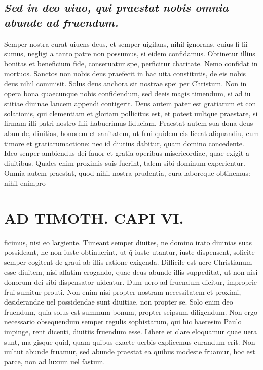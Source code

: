 \documentclass{article}
\begin{document}
\begin{pages}
\subsection*{\textit{Sed in deo uiuo, qui praestat nobis omnia abunde ad fruendum. }}\pstart Semper nostra curat uiuens deus, et semper uigilans, nihil ignorans, cuius fi lii sumus, negligi a tanto patre non possumus, si eidem confidamus. Obtinetur illius bonitas et beneficium fide, conseruatur spe, perficitur charitate. Nemo confidat in mortuos. Sanctos non nobis deus praefecit in hac uita constitutis, de eis nobis deus nihil commisit. Solus deus anchora sit nostrae spei per Christum. Non in opera bona quaecunque nobis confidendum, sed deeis magis timendum, si ad iu stitiae diuinae lancem appendi contigerit. Deus autem pater est gratiarum et con solationis, qui clementiam et gloriam pollicitus est, et potest uultque praestare, si firmam illi patri nostro filii habuerimus fiduciam. Praestat autem sua dona deus abun de, diuitias, honorem et sanitatem, ut frui quidem eis liceat aliquandiu, cum timore et gratiarumactione: nec id diutius dabitur, quam domino concedente. Ideo senper ambiendus dei fauor et gratia operibus misericordiae, quae exigit a diuitibus. Quales enim proximis suis fuerint, talem sibi dominum experientur. Omnia autem praestat, quod nihil nostra prudentia, cura laboreque obtinemus: nihil enimpro  \pend
{}
{}
\subsection*{\textit{}}
\section*{AD TIMOTH. CAPI VI. }
\marginpar{[ p.541 ]}\pstart ficimus, nisi eo largiente. Timeant semper diuites, ne domino irato diuinias suas possideant, ne non iuste obtinuerint, ut q̃ iuste utantur, iuste dispensent, solicite semper cogitent de graui ab illis ratione exigenda. Difficile est uere Christianum esse diuitem, nisi affatim erogando, quae deus abunde illis suppeditat, ut non nisi donorum dei sibi dispensator uideatur. Dum uero ad fruendum dicitur, improprie frui sumitur prouti. Non enim nisi propter nostram necessitatem et proximi, desiderandae uel possidendae sunt diuitiae, non propter se. Solo enim deo fruendum, quia solus est summum bonum, propter seipsum diligendum. Non ergo necessario obsequendum semper regulis sophistarum, qui hic haeresim Paulo impinge, rent dicenti, diuitiis fruendum esse. Libere et clare eloquamur quae uera sunt, ma gisque quid, quam quibus exacte uerbis explicemus curandum erit. Non uultut abunde fruamur, sed abunde praestat ea quibus modeste fruamur, hoc est parce, non ad luxum uel fastum.  \pend
{}
{}

\end{pages}
\end{document}
